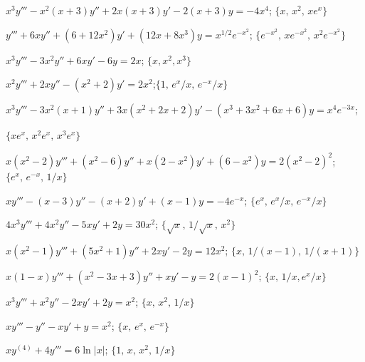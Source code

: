\begin{exerciselist}
  \item\label{exer:9.4.1} $x^{3}y'''-x^{2}(x+3)y''+2x(x+3)y'-2(x+3)y=-4x^{4}$;\quad
        $\{x,\,x^{2},\,xe^{x}\}$

  \item\label{exer:9.4.2} $y'''+6xy''+(6+12x^{2})y'+(12x+8x^{3})y=x^{1/2}e^{-x^{2}}$;\quad
        $\{e^{-x^{2}},\,xe^{-x^{2}},\,x^{2}e^{-x^{2}}\}$

  \item\label{exer:9.4.3} $x^{3}y'''-3x^{2}y''+6xy'-6y=2x$; \quad $\{x,x^{2},x^{3}\}$

  \item\label{exer:9.4.4} $x^{2}y'''+2xy''-(x^{2}+2)y'=2x^{2}$;\quad $\{1,\,e^{x}/x,\,e^{-x}/x\}$

  \item\label{exer:9.4.5}
        $x^{3}y'''-3x^{2}(x+1)y''+3x(x^{2}+2x+2)y'-(x^{3}+3x^{2}+6x+6)y=x^{4}e^{-3x}$;\quad

  $\{xe^{x},\,x^{2}e^{x},\,x^{3}e^{x}\}$

  \item\label{exer:9.4.6} $x(x^{2}-2)y'''+(x^{2}-6)y''+x(2-x^{2})y'+(6-x^{2})y=2(x^{2}-2)^{2}$;
        \quad $\{e^{x},\,e^{-x},\,1/x\}$

  \item\label{exer:9.4.7} $xy'''-(x-3)y''-(x+2)y'+(x-1)y=-4e^{-x}$; \quad
        $\{e^{x},\,e^{x}/x,\,e^{-x}/x\}$

  \item\label{exer:9.4.8} $4x^{3}y'''+4x^{2}y''-5xy'+2y=30x^{2}$; \quad
        $\{\sqrt{x},\,1/\sqrt{x},\,x^{2}\}$

  \item\label{exer:9.4.9} $x(x^{2}-1)y'''+(5x^{2}+1)y''+2xy'-2y=12x^{2}$; \quad
        $\{x,\,1/(x-1),\,1/(x+1)\}$

  \item\label{exer:9.4.10} $x(1-x)y'''+(x^{2}-3x+3)y''+xy'-y=2(x-1)^{2}$; \quad
        $\{x,\,1/x,e^{x}/x\}$

  \item\label{exer:9.4.11} $x^{3}y'''+x^{2}y''-2xy'+2y=x^{2}$; \quad $\{x,\,x^{2},\,1/x\}$

  \item\label{exer:9.4.12} $xy'''-y''-xy'+y=x^{2}$; \quad $\{x,\,e^{x},\,e^{-x}\}$

  \item\label{exer:9.4.13} $xy^{(4)}+4y'''=6\ln|x|$; \quad $\{1,\,x,\,x^{2},\,1/x\}$


\end{exerciselist}
